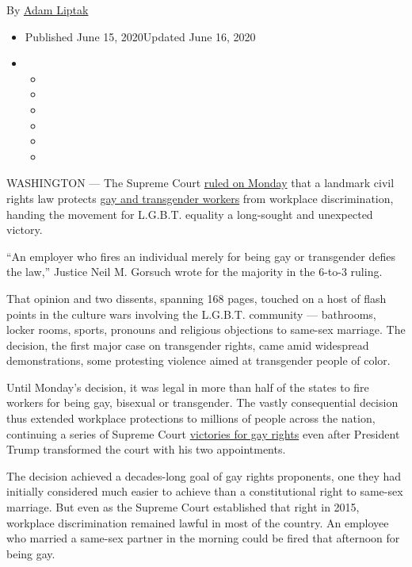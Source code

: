 By \href{https://www.nytimes3xbfgragh.onion/by/adam-liptak}{Adam Liptak}

\begin{itemize}
\item
  Published June 15, 2020Updated June 16, 2020
\item
  \begin{itemize}
  \item
  \item
  \item
  \item
  \item
  \item
  \end{itemize}
\end{itemize}

WASHINGTON --- The Supreme Court
\href{https://www.supremecourt.gov/opinions/19pdf/17-1618_hfci.pdf}{ruled
on Monday} that a landmark civil rights law protects
\href{https://www.nytimes3xbfgragh.onion/2020/06/16/podcasts/the-daily/supreme-court-lgbtq.html}{gay
and transgender workers} from workplace discrimination, handing the
movement for L.G.B.T. equality a long-sought and unexpected victory.

``An employer who fires an individual merely for being gay or
transgender defies the law,'' Justice Neil M. Gorsuch wrote for the
majority in the 6-to-3 ruling.

That opinion and two dissents, spanning 168 pages, touched on a host of
flash points in the culture wars involving the L.G.B.T. community ---
bathrooms, locker rooms, sports, pronouns and religious objections to
same-sex marriage. The decision, the first major case on transgender
rights, came amid widespread demonstrations, some protesting violence
aimed at transgender people of color.

Until Monday's decision, it was legal in more than half of the states to
fire workers for being gay, bisexual or transgender. The vastly
consequential decision thus extended workplace protections to millions
of people across the nation, continuing a series of Supreme Court
\href{https://www.nytimes3xbfgragh.onion/2015/06/27/us/supreme-court-same-sex-marriage.html}{victories
for gay rights} even after President Trump transformed the court with
his two appointments.

The decision achieved a decades-long goal of gay rights proponents, one
they had initially considered much easier to achieve than a
constitutional right to same-sex marriage. But even as the Supreme Court
established that right in 2015, workplace discrimination remained lawful
in most of the country. An employee who married a same-sex partner in
the morning could be fired that afternoon for being gay.

